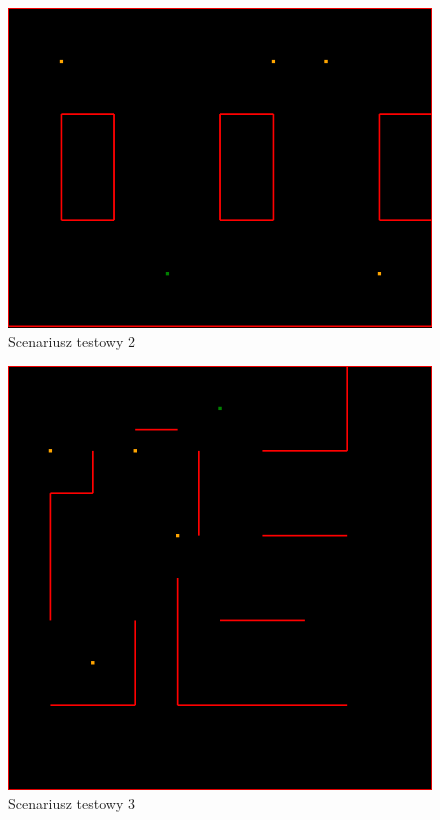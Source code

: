 \documentclass[11pt, leqno]{article}
\begin{document}
\begin{figure}[h!]
	\centering
	\includegraphics[scale=0.4]{scenario2}
	\caption{Scenariusz testowy 2}
	\label{fig:sc2}
\end{figure}

\begin{figure}[h!]
	\centering
	\includegraphics[scale=0.4]{scenario3}
	\caption{Scenariusz testowy 3}
	\label{fig:sc3}
\end{figure}
\end{document}
